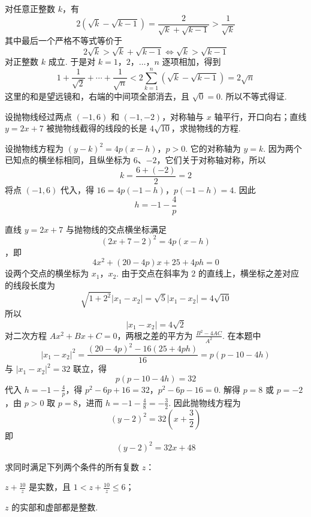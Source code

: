 \begin{solution}
对任意正整数 \(k\)，有
\[
2\left(\sqrt{k}-\sqrt{k-1}\right)=\frac{2}{\sqrt{k}+\sqrt{k-1}}>\frac{1}{\sqrt{k}}
\]
其中最后一个严格不等式等价于
\[
2\sqrt{k}>\sqrt{k}+\sqrt{k-1}
\Longleftrightarrow \sqrt{k}>\sqrt{k-1}
\]
对正整数 \(k\) 成立. 于是对 \(k=1\)，\(2\)，\(\ldots\)，\(n\) 逐项相加，得到
\[
1+\frac{1}{\sqrt{2}}+\cdots+\frac{1}{\sqrt{n}}
<2\sum_{k=1}^{n}\left(\sqrt{k}-\sqrt{k-1}\right)=2\sqrt{n}
\]
这里的和是望远镜和，右端的中间项全部消去，且 \(\sqrt0=0\). 所以不等式得证.
\end{solution}

\begin{problem}
设抛物线经过两点 \((-1,6)\) 和 \((-1,-2)\)，对称轴与 \(x\) 轴平行，开口向右；直线 \(y=2x+7\) 被抛物线截得的线段的长是 \(4\sqrt{10}\)，求抛物线的方程.
\end{problem}

\begin{solution}
设抛物线方程为
\((y-k)^2=4p(x-h)\)，\(p>0\).
它的对称轴为 \(y=k\). 因为两个已知点的横坐标相同，且纵坐标为 \(6\)、\(-2\)，它们关于对称轴对称，所以
\[
k=\frac{6+(-2)}2=2
\]
将点 \((-1,6)\) 代入，得
\(16=4p(-1-h)\)，\(p(-1-h)=4\).
因此
\[
h=-1-\frac4p
\]

直线 \(y=2x+7\) 与抛物线的交点横坐标满足
\[
(2x+7-2)^2=4p(x-h)
\]
，即
\[
4x^2+(20-4p)x+25+4ph=0
\]
设两个交点的横坐标为 \(x_1\)，\(x_2\). 由于交点在斜率为 \(2\) 的直线上，横坐标之差对应的线段长度为
\[
\sqrt{1+2^2}|x_1-x_2|=\sqrt{5}|x_1-x_2|=4\sqrt{10}
\]
所以
\[
|x_1-x_2|=4\sqrt2
\]
对二次方程 \(Ax^2+Bx+C=0\)，两根之差的平方为 \(\frac{B^2-4AC}{A^2}\). 在本题中
\[
|x_1-x_2|^2
=\frac{(20-4p)^2-16(25+4ph)}{16}
=p(p-10-4h)
\]
与 \(|x_1-x_2|^2=32\) 联立，得
\[
p(p-10-4h)=32
\]
代入 \(h=-1-\frac4p\)，得
\(p^2-6p+16=32\)，\(p^2-6p-16=0\).
解得 \(p=8\) 或 \(p=-2\)，由 \(p>0\) 取 \(p=8\)，进而 \(h=-1-\frac48=-\frac32\). 因此抛物线方程为
\[
(y-2)^2=32\left(x+\frac32\right)
\]
即
\[
(y-2)^2=32x+48
\]
\end{solution}

\begin{problem}
求同时满足下列两个条件的所有复数 \(z\)：
\begin{circlelist}
\item \(z+\frac{10}{z}\) 是实数，且 \(1<z+\frac{10}{z}\leqslant 6\)；
\item \(z\) 的实部和虚部都是整数.
\end{circlelist}
\end{problem}

